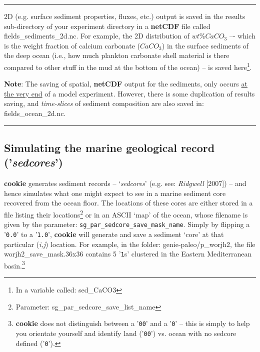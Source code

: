\vspace{1mm}\noindent\rule{4cm}{0.1mm}\vspace{2mm}

\noindent 2D (e.g. surface sediment properties, fluxes, etc.) output is saved in the \textsf{\footnotesize results} sub-directory of your experiment directory in a \textbf{netCDF} file called \textsf{\footnotesize fields\_sediments\_2d.nc}. For example, the 2D distribution of \(wt\% CaCO_{3}\) –- which is the weight fraction of calcium carbonate (\(CaCO_{3}\)) in the surface sediments of the deep ocean (i.e., how much plankton carbonate shell material is there compared to other stuff in the mud at the bottom of the ocean) -- is saved here\footnote{In a variable called: \textsf{\footnotesize sed\_CaCO3}}. 

\vspace{1mm}
\noindent \textbf{Note}: The saving of spatial, \textbf{netCDF} output for the sediments, only occurs \uline{at the very end} of a model experiment. However, there is some duplication of results saving, and \textit{time-slices} of sediment composition are also saved in: \textsf{\footnotesize fields\_ocean\_2d.nc}.

\vspace{1mm}\noindent\rule{4cm}{0.1mm}\vspace{2mm}

\subsection{Simulating the marine geological record ('\textit{sedcores}')}

\textbf{cookie} generates sediment records -- ‘\textit{sedcores}’ (e.g. see: \textit{Ridgwell} [2007]) -- and hence simulates what one might expect to see in a marine sediment core recovered from the ocean floor. The locations of these cores are either stored in a file listing their locations\footnote{Parameter: \textsf{sg\_par\_sedcore\_save\_list\_name}} or in an ASCII ‘map’ of the ocean, whose filename is given by the parameter: \texttt{\small sg\_par\_sedcore\_save\_mask\_name}. Simply by flipping a '\texttt{\small 0.0}' to a '\texttt{\small 1.0}', \textbf{cookie} will generate and save a sediment ‘core’ at that particular (\textit{i,j}) location. For example, in the folder: \textsf{\footnotesize genie-paleo/p\_worjh2}, the file \textsf{\footnotesize worjh2\_save\_mask.36x36} contains 5 '\texttt{\small 1}s' clustered in the Eastern Mediterranean basin.\footnote{\textbf{cookie} does not distinguish between a '\texttt{\small 00}' and a '\texttt{\small 0}' -- this is simply to help you orientate yourself and identify land ('\texttt{\small 00}') vs. ocean with no sedcore defined ('\texttt{\small 0}').}

